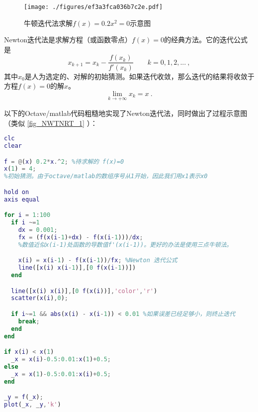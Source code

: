 

\begin{figure}[ht]
\centering
\texttt{[image: ./figures/ef3a3fca036b7c2e.pdf]}
\caption{牛顿迭代法求解$f(x)=0.2x^2=0$示意图} \label{fig_NWTNRT_1}
\end{figure}

Newton迭代法是求解方程（或函数零点）$f(x)=0$的经典方法。它的迭代公式是
\begin{equation}
x_{k+1} = x_k-\frac{f(x_k)}{f'(x_k)} \qquad k=0,1,2,...~,
\end{equation}
其中$x_0$是人为选定的、对解的初始猜测。如果迭代收敛，那么迭代的结果将收敛于方程$f(x)=0$的解$x$。
$$\lim_{k\to+\infty} x_k = x~.$$

以下的Octave/matlab代码粗糙地实现了Newton迭代法，同时做出了过程示意图（类似 \autoref{fig_NWTNRT_1} ）：
\begin{lstlisting}[language=matlab]
clc
clear

f = @(x) 0.2*x.^2; %待求解的 f(x)=0
x(1) = 4;  
%初始猜测。由于octave/matlab的数组序号从1开始，因此我们用x1表示x0

hold on
axis equal

for i = 1:100
  if i ~=1
    dx = 0.001;
    fx = (f(x(i-1)+dx) - f(x(i-1)))/dx; 
    %数值近似x(i-1)处函数的导数值f'(x(i-1))。更好的办法是使用三点牛顿法。

    x(i) = x(i-1) - f(x(i-1))/fx; %Newton 迭代公式
    line([x(i) x(i-1)],[0 f(x(i-1))])
  end

  line([x(i) x(i)],[0 f(x(i))],'color','r')
  scatter(x(i),0);

  if i~=1 && abs(x(i) - x(i-1)) < 0.01 %如果误差已经足够小，则终止迭代
    break;
  end
end

if x(i) < x(1)
  _x = x(i)-0.5:0.01:x(1)+0.5;
else
  _x = x(1)-0.5:0.01:x(i)+0.5;
end

_y = f(_x);
plot(_x, _y,'k')
\end{lstlisting}
